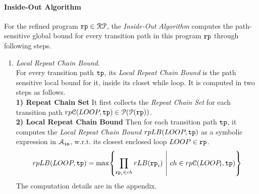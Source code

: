 \paragraph*{Inside-Out Algorithm}
For the refined program $\mathtt{rp} \in \mathcal{RP}$, the \emph{Inside-Out Algorithm}
computes the path-sensitive global bound for every transition path in this program $\mathtt{rp}$ through following steps.

\begin{enumerate}
  \item \emph{Local Repeat Chain Bound}.
  \\
  For every transition path $\mathtt{tp}$, its \emph{Local Repeat Chain Bound} is the 
  path sensitive local bound for it, inside its closet while loop.
  It is computed in two steps as follows.
\\
\textbf{1) Repeat Chain Set} It first collects the \emph{Repeat Chain Set}
for each transition path  $rp\mathcal{C}(LOOP, \mathtt{tp}) \in \mathcal{P}(\mathcal{P}(\mathtt{rp}))$.
\\
\textbf{2) Local Repeat Chain Bound}  Then for each transition path $\mathtt{tp}$,
it computes
the  \emph{Local Repeat Chain Bound} $rpLB(LOOP, \mathtt{tp})$ as a symbolic expression in $\mathcal{A}_{\mathtt{in}}$, w.r.t.
its closest enclosed loop $LOOP \in \mathtt{rp}$.
\[rpLB(LOOP, \tpath) = \max \left\{ \prod\limits_{\rprog_i \in ch}  rLB(\rprog_i) 
  ~\middle\vert~ ch \in rp\mathcal{C}(LOOP_l, \tpath) \right\}
  \]
%
The computation details are in the appendix.

\end{enumerate}
